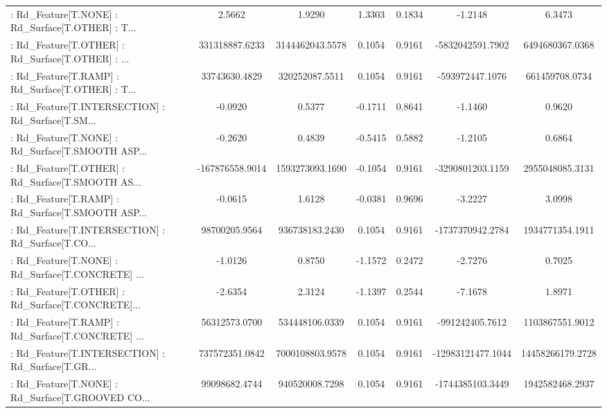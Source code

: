 \begin{longtable}{p{4cm}cccccc}
 : Rd\_Feature[T.NONE] : Rd\_Surface[T.OTHER] : T... &            2.5662 &            1.9290 &  1.3303 &       0.1834 &            -1.2148 &            6.3473 \\
 : Rd\_Feature[T.OTHER] : Rd\_Surface[T.OTHER] : ... &    331318887.6233 &   3144462043.5578 &  0.1054 &       0.9161 &   -5832042591.7902 &   6494680367.0368 \\
 : Rd\_Feature[T.RAMP] : Rd\_Surface[T.OTHER] : T... &     33743630.4829 &    320252087.5511 &  0.1054 &       0.9161 &    -593972447.1076 &    661459708.0734 \\
 : Rd\_Feature[T.INTERSECTION] : Rd\_Surface[T.SM... &           -0.0920 &            0.5377 & -0.1711 &       0.8641 &            -1.1460 &            0.9620 \\
 : Rd\_Feature[T.NONE] : Rd\_Surface[T.SMOOTH ASP... &           -0.2620 &            0.4839 & -0.5415 &       0.5882 &            -1.2105 &            0.6864 \\
 : Rd\_Feature[T.OTHER] : Rd\_Surface[T.SMOOTH AS... &   -167876558.9014 &   1593273093.1690 & -0.1054 &       0.9161 &   -3290801203.1159 &   2955048085.3131 \\
 : Rd\_Feature[T.RAMP] : Rd\_Surface[T.SMOOTH ASP... &           -0.0615 &            1.6128 & -0.0381 &       0.9696 &            -3.2227 &            3.0998 \\
 : Rd\_Feature[T.INTERSECTION] : Rd\_Surface[T.CO... &     98700205.9564 &    936738183.2430 &  0.1054 &       0.9161 &   -1737370942.2784 &   1934771354.1911 \\
 : Rd\_Feature[T.NONE] : Rd\_Surface[T.CONCRETE] ... &           -1.0126 &            0.8750 & -1.1572 &       0.2472 &            -2.7276 &            0.7025 \\
 : Rd\_Feature[T.OTHER] : Rd\_Surface[T.CONCRETE]... &           -2.6354 &            2.3124 & -1.1397 &       0.2544 &            -7.1678 &            1.8971 \\
 : Rd\_Feature[T.RAMP] : Rd\_Surface[T.CONCRETE] ... &     56312573.0700 &    534448106.0339 &  0.1054 &       0.9161 &    -991242405.7612 &   1103867551.9012 \\
 : Rd\_Feature[T.INTERSECTION] : Rd\_Surface[T.GR... &    737572351.0842 &   7000108803.9578 &  0.1054 &       0.9161 &  -12983121477.1044 &  14458266179.2728 \\
 : Rd\_Feature[T.NONE] : Rd\_Surface[T.GROOVED CO... &     99098682.4744 &    940520008.7298 &  0.1054 &       0.9161 &   -1744385103.3449 &   1942582468.2937 \\

\end{longtable}
